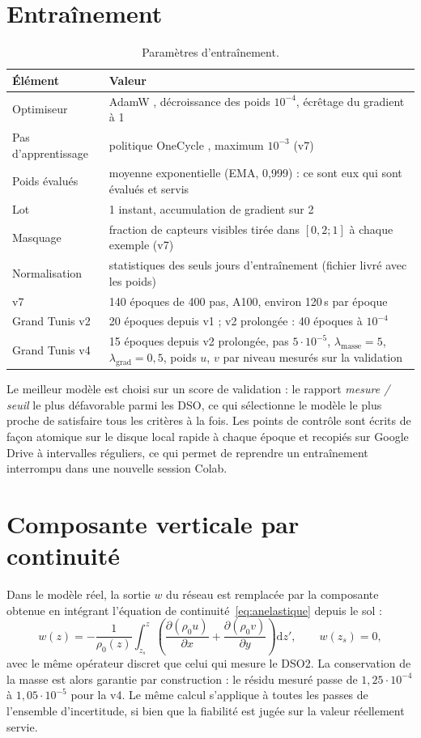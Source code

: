 \section{Entraînement}
\begin{table}[H]
\centering
\caption{Paramètres d'entraînement.}
\label{tab:entrainement}
\begin{tabularx}{\linewidth}{@{}lX@{}}
\toprule
Élément & Valeur\\
\midrule
Optimiseur & AdamW \citep{loshchilov2019}, décroissance des poids $10^{-4}$, écrêtage du gradient à 1\\
Pas d'apprentissage & politique OneCycle \citep{smith2019}, maximum $10^{-3}$ (v7)\\
Poids évalués & moyenne exponentielle (EMA, 0,999) : ce sont eux qui sont évalués et servis\\
Lot & 1 instant, accumulation de gradient sur 2\\
Masquage & fraction de capteurs visibles tirée dans $[0{,}2 ; 1]$ à chaque exemple (v7)\\
Normalisation & statistiques des seuls jours d'entraînement (fichier livré avec les poids)\\
v7 & 140 époques de 400 pas, A100, environ 120\,s par époque\\
Grand Tunis v2 & 20 époques depuis v1 ; v2 prolongée : 40 époques à $10^{-4}$\\
Grand Tunis v4 & 15 époques depuis v2 prolongée, pas $5\cdot10^{-5}$, $\lambda_{\mathrm{masse}} = 5$, $\lambda_{\mathrm{grad}} = 0{,}5$, poids $u$, $v$ par niveau mesurés sur la validation\\
\bottomrule
\end{tabularx}
\end{table}

Le meilleur modèle est choisi sur un score de validation : le rapport \emph{mesure / seuil} le plus
défavorable parmi les DSO, ce qui sélectionne le modèle le plus proche de satisfaire tous les
critères à la fois. Les points de contrôle sont écrits de façon atomique sur le disque local
rapide à chaque époque et recopiés sur Google Drive à intervalles réguliers, ce qui permet de
reprendre un entraînement interrompu dans une nouvelle session Colab.

\section{Composante verticale par continuité}
\label{sec:wcont}
Dans le modèle réel, la sortie $w$ du réseau est remplacée par la composante obtenue en intégrant
l'équation de continuité~\eqref{eq:anelastique} depuis le sol :
\begin{equation}
  w(z) = -\frac{1}{\rho_0(z)}\int_{z_s}^{z}
  \left(\frac{\partial(\rho_0 u)}{\partial x} + \frac{\partial(\rho_0 v)}{\partial y}\right)\mathrm{d}z',
  \qquad w(z_s) = 0,
\end{equation}
avec le même opérateur discret que celui qui mesure le DSO2. La conservation de la masse est alors
garantie par construction : le résidu mesuré passe de $1{,}25\cdot10^{-4}$ à $1{,}05\cdot10^{-5}$
pour la v4. Le même calcul s'applique à toutes les passes de l'ensemble d'incertitude, si bien que
la fiabilité est jugée sur la valeur réellement servie.

